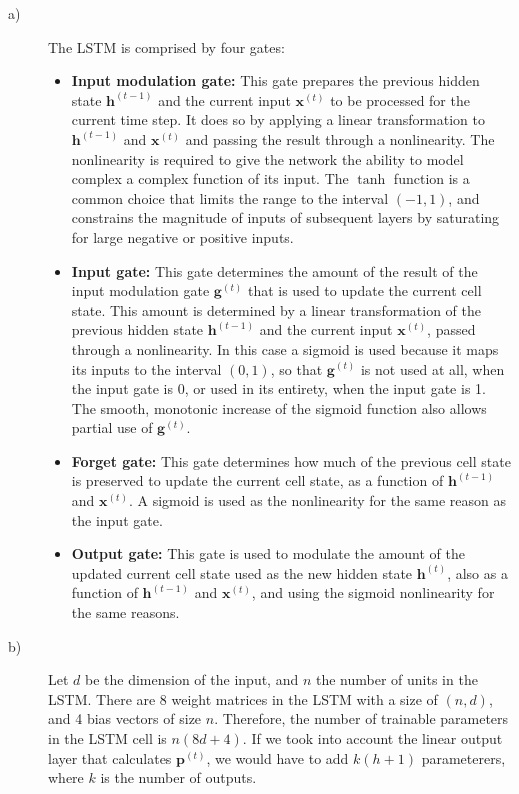 \documentclass{article}
\begin{document}
\begin{description}
\item[a)] The LSTM is comprised by four gates:
\begin{itemize}
\item \textbf{Input modulation gate:} This gate prepares the previous hidden state $\mathbf{h}^{(t-1)}$ and the current input $\mathbf{x}^{(t)}$ to be processed for the current time step. It does so by applying a linear transformation to $\mathbf{h}^{(t-1)}$ and $\mathbf{x}^{(t)}$ and passing the result through a nonlinearity. The nonlinearity is required to give the network the ability to model complex a complex function of its input. The $\tanh$ function is a common choice that limits the range to the interval $(-1, 1)$, and constrains the magnitude of inputs of subsequent layers by saturating for large negative or positive inputs.
\item \textbf{Input gate:} This gate determines the amount of the result of the input modulation gate $\mathbf{g}^{(t)}$ that is used to update the current cell state. This amount is determined by a linear transformation of the previous hidden state $\mathbf{h}^{(t-1)}$ and the current input $\mathbf{x}^{(t)}$, passed through a nonlinearity. In this case a sigmoid is used because it maps its inputs to the interval $(0,1)$, so that $\mathbf{g}^{(t)}$ is not used at all, when the input gate is 0, or used in its entirety, when the input gate is 1. The smooth, monotonic increase of the sigmoid function also allows partial use of $\mathbf{g}^{(t)}$.
\item \textbf{Forget gate:} This gate determines how much of the previous cell state is preserved to update the current cell state, as a function of $\mathbf{h}^{(t-1)}$ and $\mathbf{x}^{(t)}$. A sigmoid is used as the nonlinearity for the same reason as the input gate.
\item \textbf{Output gate:} This gate is used to modulate the amount of the updated current cell state used as the new hidden state $\mathbf{h}^{(t)}$, also as a function of $\mathbf{h}^{(t-1)}$ and $\mathbf{x}^{(t)}$, and using the sigmoid nonlinearity for the same reasons.
\end{itemize}

\item[b)] Let $d$ be the dimension of the input, and $n$ the number of units in the LSTM. There are 8 weight matrices in the LSTM with a size of $(n, d)$, and 4 bias vectors of size $n$. Therefore, the number of trainable parameters in the LSTM cell is $n(8d + 4)$. If we took into account the linear output layer that calculates $\mathbf{p}^{(t)}$, we would have to add $k(h + 1)$ parameterers, where $k$ is the number of outputs.
\end{description}
\end{document}
